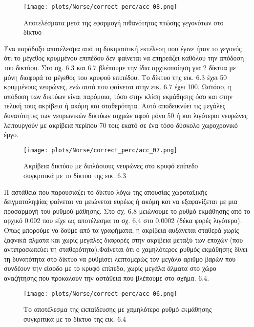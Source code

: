\documentclass[12pt]{report}
\begin{document}
\begin{figure}[htp] %
    \centering
     \texttt{[image: plots/Norse/correct\_perc/acc\_08.png]}
    \caption{Αποτελέσματα μετά της εφαρμογή πιθανότητας πτώσης γεγονότων στο δίκτυο}
    \label{fig:representation-methods}
\end{figure}

Ένα παράδοξο αποτέλεσμα από τη δοκιμαστική εκτέλεση που έγινε ήταν το γεγονός ότι το μέγεθος κρυμμένου επιπέδου δεν φαίνεται να επηρεάζει καθόλου την απόδοση του δικτύου. Στο σχ. 6.3 και 6.7 βλέπουμε την ίδια αρχικοποίηση για 2 δίκτυα με μόνη διαφορά το μέγεθος του κρυφού επιπέδου. Το δίκτυο της εικ. 6.3 έχει 50 κρυμμένους νευρώνες, ενώ αυτό που φαίνεται στην εικ. 6.7 έχει 100. Ωστόσο, η απόδοση των δικτύων είναι παρόμοια, τόσο στην κλίση εκμάθησης όσο και στην τελική τους ακρίβεια ή ακόμη και σταθερότητα. Αυτό αποδεικνύει τις μεγάλες δυνατότητες των νευρωνικών δικτύων αιχμών αφού μόνο 50 ή και λιγότεροι νευρώνες λειτουργούν με ακρίβεια περίπου 70 τοις εκατό σε ένα τόσο δύσκολο χωροχρονικό έργο.

\begin{figure}[htp] %
    \centering
     \texttt{[image: plots/Norse/correct\_perc/acc\_07.png]}
    \caption{Ακρίβεια δικτύου με διπλάσιους νευρώνες στο κρυφό επίπεδο συγκριτικά με το δίκτυο της εικ. 6.3}
    \label{fig:representation-methods}
\end{figure}

Η αστάθεια που παρουσιάζει το δίκτυο λόγω της απουσίας χωροταξικής δειγματοληψίας φαίνεται να μειώνεται ευρέως ή ακόμη και να εξαφανίζεται με μια προσαρμογή του ρυθμού μάθησης. Στο σχ. 6.8 μειώνουμε το ρυθμό εκμάθησης από το αρχικό 0.002 που είχε ως αποτέλεσμα το σχ. 6,4 στο 0,0002 (δέκα φορές λιγότερο). Όπως μπορούμε να δούμε από τα γραφήματα, η ακρίβεια αυξάνεται σταθερά χωρίς ξαφνικά άλματα και χωρίς μεγάλες διαφορές στην ακρίβεια μεταξύ των εποχών (που αντιπροσωπεύει τη σταθερότητα).Φαίνεται ότι ο χαμηλότερος ρυθμός εκμάθησης δίνει τη δυνατότητα στο δίκτυο να ρυθμίσει λεπτομερώς τον μεγάλο αριθμό βαρών που συνδέουν την είσοδο με το κρυφό επίπεδο, χωρίς μεγάλα άλματα στο χώρο αναζήτησης που προκαλούν την αστάθεια που βλέπουμε στο σχήμα. 6.4.

\begin{figure}[htp] %
    \centering
     \texttt{[image: plots/Norse/correct\_perc/acc\_06.png]}
    \caption{Το αποτέλεσμα της εκπαίδευσης με χαμηλότερο ρυθμό εκμάθησης συγκριτικά με το δίκτυο της εικ. 6.4}
    \label{fig:representation-methods}
\end{figure}
\end{document}
